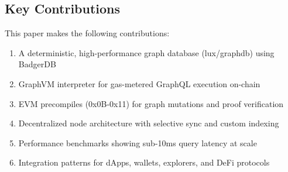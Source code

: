 \subsection{Key Contributions}

This paper makes the following contributions:

\begin{enumerate}
\item A deterministic, high-performance graph database (lux/graphdb) using BadgerDB
\item GraphVM interpreter for gas-metered GraphQL execution on-chain
\item EVM precompiles (0x0B-0x11) for graph mutations and proof verification
\item Decentralized node architecture with selective sync and custom indexing
\item Performance benchmarks showing sub-10ms query latency at scale
\item Integration patterns for dApps, wallets, explorers, and DeFi protocols
\end{enumerate}

